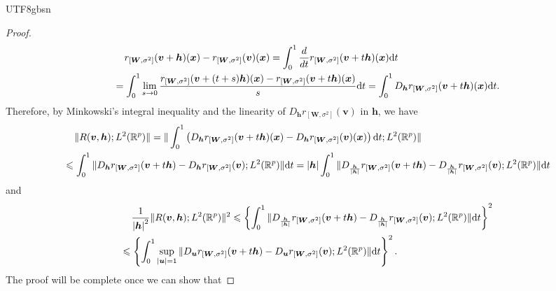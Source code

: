 \documentclass[12pt]{report}
\newcommand\tab[1][1cm]{\hspace*{#1}}
\newcommand{\bracket}[1]{\left ( #1 \right )}
\newcommand{\curly}[1]{\left \{ #1 \right \} }
\theoremstyle{plain}
\theoremstyle{definition}
\begin{document}
\begin{CJK*}{UTF8}{gbsn}
\begin{proof}
\begin{equation*}
  \begin{split}
  & \tab[0.4cm] r_{[\bm{W},\sigma^2]}(\bm{v}+\bm{h})(\bm{x}) - 
  r_{[\bm{W},\sigma^2]}(\bm{v})(\bm{x}) 
  = \int_{0}^1 \frac{d}{dt} r_{[\bm{W},\sigma^2]}(\bm{v}+t\bm{h})(\bm{x}) \mathrm{d} t 
  \\ & = \int_{0}^1 \lim_{s \to 0} \frac{r_{[\bm{W},\sigma^2]}(\bm{v}+(t+s)\bm{h})(\bm{x})
  - r_{[\bm{W},\sigma^2]}(\bm{v}+t\bm{h})(\bm{x})}{s} \mathrm{d} t 
  = \int_{0}^1 D_{\bm{h}}r_{[\bm{W},\sigma^2]}(\bm{v}+t\bm{h})(\bm{x}) \mathrm{d} t.
  \end{split}
\end{equation*}
Therefore,
by Minkowski's integral inequality and the linearity of $D_{\bm{h}}r_{[\bm{W},\sigma^2]}(\bm{v})$
in $\bm{h}$, we have
\begin{equation*}
  \begin{split}
  & \tab[0.4cm] 
  \|R(\bm{v}, \bm{h});L^2(\mathbb{R}^p)	\|
  = \|\int_{0}^1 \bracket{D_{\bm{h}}r_{[\bm{W},\sigma^2]}(\bm{v}+t\bm{h})(\bm{x})- D_{\bm{h}}r_{[\bm{W},\sigma^2]}(\bm{v})(\bm{x})} 
  \mathrm{d} t;L^2(\mathbb{R}^p)	\|
  \\ & \leqslant \int_{0}^1 
  \|D_{\bm{h}}r_{[\bm{W},\sigma^2]}(\bm{v}+t\bm{h})- D_{\bm{h}}r_{[\bm{W},\sigma^2]}(\bm{v})
  ;L^2(\mathbb{R}^p)	\| \mathrm{d} t
  = \abs{\bm{h}} \int_{0}^1 
  \|D_{\frac{\bm{h}}{\abs{\bm{h}}}}r_{[\bm{W},\sigma^2]}(\bm{v}+t\bm{h})- D_{\frac{\bm{h}}{\abs{\bm{h}}}}r_{[\bm{W},\sigma^2]}(\bm{v})
  ;L^2(\mathbb{R}^p)	\| \mathrm{d} t
  \end{split}
\end{equation*}
and 
\begin{equation*}
  \begin{split}
  & \tab[0.4cm] \frac{1}{\abs{\bm{h}}^2}
  \|R(\bm{v}, \bm{h});L^2(\mathbb{R}^p)	\|^2 \leqslant
  \curly{\int_{0}^1 
  \|D_{\frac{\bm{h}}{\abs{\bm{h}}}}r_{[\bm{W},\sigma^2]}(\bm{v}+t\bm{h})- D_{\frac{\bm{h}}{\abs{\bm{h}}}}r_{[\bm{W},\sigma^2]}(\bm{v})
  ;L^2(\mathbb{R}^p)	\| \mathrm{d} t}^2
  \\ & \leqslant 
  \curly{\int_{0}^1 \sup_{\abs{\bm{u}} = 1}
  \|D_{\bm{u}}r_{[\bm{W},\sigma^2]}(\bm{v}+t\bm{h})- D_{\bm{u}}r_{[\bm{W},\sigma^2]}(\bm{v})
  ;L^2(\mathbb{R}^p)	\| \mathrm{d} t}^2.
  \end{split}
\end{equation*}
The proof will be complete once we can show that


\end{proof}
\end{CJK*}
\end{document}
